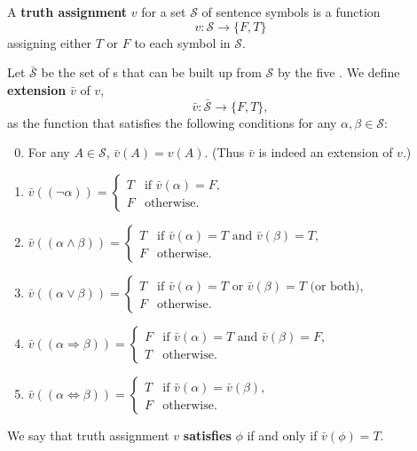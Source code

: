 \documentclass{report}
\begin{document}
\section{}%

  A \textbf{truth assignment} $v$ for a set $\mathcal{S}$ of sentence symbols is
    a function $$v \colon \mathcal{S} \rightarrow \{F, T\}$$ assigning either
    $T$ or $F$ to each symbol in $\mathcal{S}$.

  Let $\bar{\mathcal{S}}$ be the set of s that
    can be built up from $\mathcal{S}$ by the five
    .
  We define \textbf{extension} $\bar{v}$ of $v$,
    $$\bar{v} \colon \bar{\mathcal{S}} \rightarrow \{F, T\},$$
    as the function that satisfies the following conditions for any
    $\alpha, \beta \in \mathcal{S}$:
    \begin{enumerate}[(1)]
      \setcounter{enumi}{-1}
      \item For any $A \in \mathcal{S}$, $\bar{v}(A) = v(A)$.
        (Thus $\bar{v}$ is indeed an extension of $v$.)
      \item $\bar{v}((\neg\alpha)) = \begin{cases}
          T & \text{if } \bar{v}(\alpha) = F, \\
          F & \text{otherwise}.
        \end{cases}$
      \item $\bar{v}((\alpha \land \beta)) = \begin{cases}
          T & \text{if } \bar{v}(\alpha) = T \text{ and } \bar{v}(\beta) = T, \\
          F & \text{otherwise}.
        \end{cases}$
      \item $\bar{v}((\alpha \lor \beta)) = \begin{cases}
          T & \text{if } \bar{v}(\alpha) = T \text{ or }
            \bar{v}(\beta) = T \text{ (or both)}, \\
          F & \text{otherwise}.
        \end{cases}$
      \item $\bar{v}((\alpha \Rightarrow \beta)) = \begin{cases}
          F & \text{if } \bar{v}(\alpha) = T \text{ and } \bar{v}(\beta) = F, \\
          T & \text{otherwise}.
        \end{cases}$
      \item $\bar{v}((\alpha \Leftrightarrow \beta)) = \begin{cases}
          T & \text{if } \bar{v}(\alpha) = \bar{v}(\beta), \\
          F & \text{otherwise}.
        \end{cases}$
    \end{enumerate}
  We say that truth assignment $v$ \textbf{satisfies} $\phi$ if and only if
    $\bar{v}(\phi) = T$.
\end{document}
